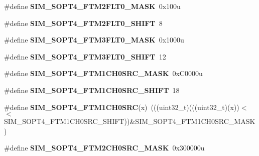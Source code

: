 \begin{DoxyCompactItemize}
\item 
\#define {\bfseries S\+I\+M\+\_\+\+S\+O\+P\+T4\+\_\+\+F\+T\+M2\+F\+L\+T0\+\_\+\+M\+A\+SK}~0x100u\hypertarget{group__SIM__Register__Masks_ga4f61f56a63a5d239be393708c17cf82c}{}\label{group__SIM__Register__Masks_ga4f61f56a63a5d239be393708c17cf82c}

\item 
\#define {\bfseries S\+I\+M\+\_\+\+S\+O\+P\+T4\+\_\+\+F\+T\+M2\+F\+L\+T0\+\_\+\+S\+H\+I\+FT}~8\hypertarget{group__SIM__Register__Masks_ga15275ae91c6efbf697f472b940369401}{}\label{group__SIM__Register__Masks_ga15275ae91c6efbf697f472b940369401}

\item 
\#define {\bfseries S\+I\+M\+\_\+\+S\+O\+P\+T4\+\_\+\+F\+T\+M3\+F\+L\+T0\+\_\+\+M\+A\+SK}~0x1000u\hypertarget{group__SIM__Register__Masks_ga94a2b4111642b78585a992d67795b04c}{}\label{group__SIM__Register__Masks_ga94a2b4111642b78585a992d67795b04c}

\item 
\#define {\bfseries S\+I\+M\+\_\+\+S\+O\+P\+T4\+\_\+\+F\+T\+M3\+F\+L\+T0\+\_\+\+S\+H\+I\+FT}~12\hypertarget{group__SIM__Register__Masks_ga9a9a64cd84c357ba5c5459aca027465c}{}\label{group__SIM__Register__Masks_ga9a9a64cd84c357ba5c5459aca027465c}

\item 
\#define {\bfseries S\+I\+M\+\_\+\+S\+O\+P\+T4\+\_\+\+F\+T\+M1\+C\+H0\+S\+R\+C\+\_\+\+M\+A\+SK}~0x\+C0000u\hypertarget{group__SIM__Register__Masks_ga8be459723f070708becab666dc6abc47}{}\label{group__SIM__Register__Masks_ga8be459723f070708becab666dc6abc47}

\item 
\#define {\bfseries S\+I\+M\+\_\+\+S\+O\+P\+T4\+\_\+\+F\+T\+M1\+C\+H0\+S\+R\+C\+\_\+\+S\+H\+I\+FT}~18\hypertarget{group__SIM__Register__Masks_gaee4e8fb1805bded49220a407c1620345}{}\label{group__SIM__Register__Masks_gaee4e8fb1805bded49220a407c1620345}

\item 
\#define {\bfseries S\+I\+M\+\_\+\+S\+O\+P\+T4\+\_\+\+F\+T\+M1\+C\+H0\+S\+RC}(x)~(((uint32\+\_\+t)(((uint32\+\_\+t)(x))$<$$<$S\+I\+M\+\_\+\+S\+O\+P\+T4\+\_\+\+F\+T\+M1\+C\+H0\+S\+R\+C\+\_\+\+S\+H\+I\+FT))\&S\+I\+M\+\_\+\+S\+O\+P\+T4\+\_\+\+F\+T\+M1\+C\+H0\+S\+R\+C\+\_\+\+M\+A\+SK)\hypertarget{group__SIM__Register__Masks_gaafa0324827d777673c2170317942e24b}{}\label{group__SIM__Register__Masks_gaafa0324827d777673c2170317942e24b}

\item 
\#define {\bfseries S\+I\+M\+\_\+\+S\+O\+P\+T4\+\_\+\+F\+T\+M2\+C\+H0\+S\+R\+C\+\_\+\+M\+A\+SK}~0x300000u\hypertarget{group__SIM__Register__Masks_ga0dcacc22852e0ee0a7a853a51b422b70}{}\label{group__SIM__Register__Masks_ga0dcacc22852e0ee0a7a853a51b422b70}


\end{DoxyCompactItemize}
